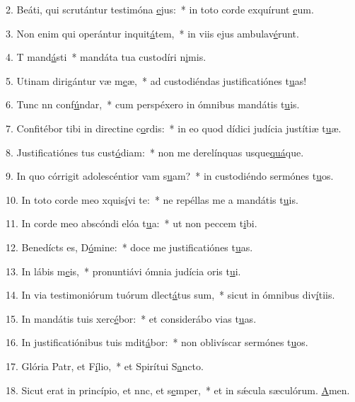 2. Beáti, qui scrutántur testimóna \uline{e}jus:~* in toto corde exquírunt \uline{e}um.\par 
3. Non enim qui operántur inquit\uline{á}tem,~* in viis ejus ambulav\uline{é}runt.\par 
4. T mand\uline{á}sti~* mandáta tua custodíri n\uline{i}mis.\par 
5. Utinam dirigántur væ m\uline{e}æ,~* ad custodiéndas justificatiónes t\uline{u}as!\par 
6. Tunc nn conf\uline{ú}ndar,~* cum perspéxero in ómnibus mandátis t\uline{u}is.\par 
7. Confitébor tibi in directine c\uline{o}rdis:~* in eo quod dídici judícia justítiæ t\uline{u}æ.\par 
8. Justificatiónes tus cust\uline{ó}diam:~* non me derelínquas usque\uline{quá}que.\par 
9. In quo córrigit adolescéntior vam s\uline{u}am?~* in custodiéndo sermónes t\uline{u}os.\par 
10. In toto corde meo xquis\uline{í}vi te:~* ne repéllas me a mandátis t\uline{u}is.\par 
11. In corde meo abscóndi elóa t\uline{u}a:~* ut non peccem t\uline{i}bi.\par 
12. Benedícts es, D\uline{ó}mine:~* doce me justificatiónes t\uline{u}as.\par 
13. In lábis m\uline{e}is,~* pronuntiávi ómnia judícia oris t\uline{u}i.\par 
14. In via testimoniórum tuórum dlect\uline{á}tus sum,~* sicut in ómnibus div\uline{í}tiis.\par 
15. In mandátis tuis xerc\uline{é}bor:~* et considerábo vias t\uline{u}as.\par 
16. In justificatiónibus tuis mdit\uline{á}bor:~* non oblivíscar sermónes t\uline{u}os.\par 
17. Glória Patr, et F\uline{í}lio,~* et Spirítui S\uline{a}ncto.\par 
18. Sicut erat in princípio, et nnc, et s\uline{e}mper,~* et in sǽcula sæculórum. \uline{A}men.\par 
